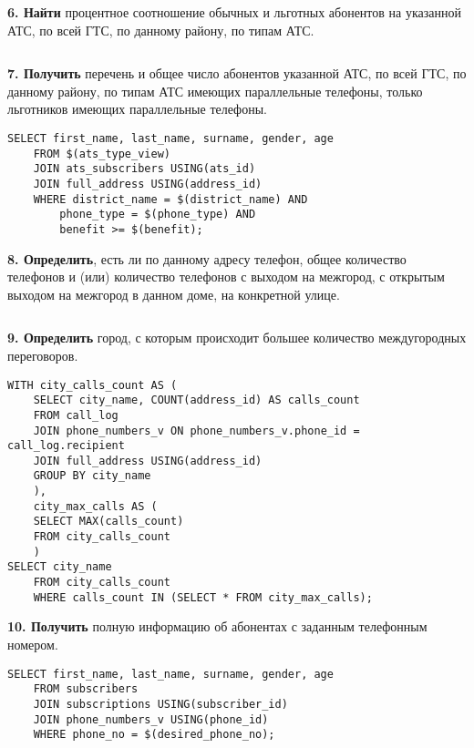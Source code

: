 \documentclass{report}
\begin{document}
\textbf{6. Найти} процентное соотношение обычных и льготных абонентов 
на указанной АТС, по всей ГТС, по данному району, по типам АТС.

\begin{lstlisting}

\end{lstlisting}

\textbf{7. Получить} перечень и общее число абонентов указанной АТС, 
по всей ГТС, по данному району, по типам АТС имеющих параллельные телефоны, 
только льготников имеющих параллельные телефоны.

\begin{lstlisting}
SELECT first_name, last_name, surname, gender, age
    FROM $(ats_type_view) 
    JOIN ats_subscribers USING(ats_id)
    JOIN full_address USING(address_id)
    WHERE district_name = $(district_name) AND
        phone_type = $(phone_type) AND
        benefit >= $(benefit);
\end{lstlisting}

\textbf{8. Определить}, есть ли по данному адресу телефон, общее 
количество телефонов и (или) количество телефонов с выходом на межгород, 
с открытым выходом на межгород в данном доме, на конкретной улице.

\begin{lstlisting}

\end{lstlisting}

\textbf{9. Определить} город, с которым происходит большее количество 
междугородных переговоров.

\begin{lstlisting}
WITH city_calls_count AS (
    SELECT city_name, COUNT(address_id) AS calls_count
    FROM call_log 
    JOIN phone_numbers_v ON phone_numbers_v.phone_id = call_log.recipient
    JOIN full_address USING(address_id)
    GROUP BY city_name
    ), 
    city_max_calls AS (
    SELECT MAX(calls_count)
    FROM city_calls_count 
    )
SELECT city_name
    FROM city_calls_count
    WHERE calls_count IN (SELECT * FROM city_max_calls);
\end{lstlisting}

\textbf{10. Получить} полную информацию об абонентах с заданным телефонным номером.

\begin{lstlisting}
SELECT first_name, last_name, surname, gender, age
    FROM subscribers
    JOIN subscriptions USING(subscriber_id)
    JOIN phone_numbers_v USING(phone_id)
    WHERE phone_no = $(desired_phone_no);
\end{lstlisting}
\end{document}
